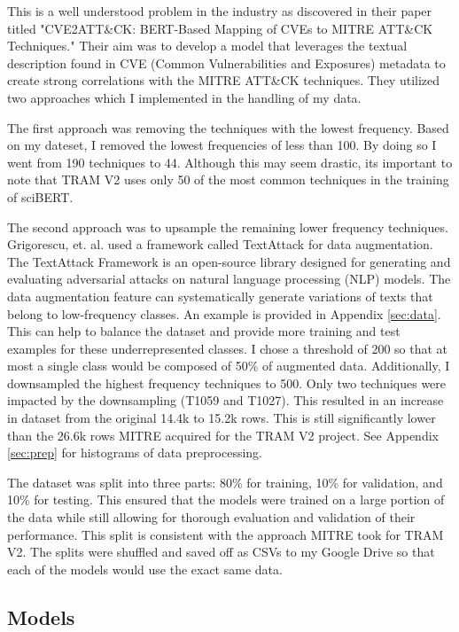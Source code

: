 \documentclass[11pt]{article}
\begin{document}
This is a well understood problem in the industry as \cite{grigorescu2022cve2att} discovered in their paper titled "CVE2ATT\&CK: BERT-Based Mapping of CVEs to MITRE ATT\&CK Techniques." Their aim was to develop a model that leverages the textual description found in CVE (Common Vulnerabilities and Exposures) metadata to create strong correlations with the MITRE ATT\&CK techniques. They utilized two approaches which I implemented in the handling of my data. 

The first approach was removing the techniques with the lowest frequency. Based on my dateset, I removed the lowest frequencies of less than 100. By doing so I went from 190 techniques to 44. Although this may seem drastic, its important to note that TRAM V2 uses only 50 of the most common techniques in the training of sciBERT. 

The second approach was to upsample the remaining lower frequency techniques. Grigorescu, et. al. used a framework called TextAttack for data augmentation. The TextAttack Framework is an open-source library designed for generating and evaluating adversarial attacks on natural language processing (NLP) models. The data augmentation feature can systematically generate variations of texts that belong to low-frequency classes. An example is provided in Appendix \ref{sec:data}. This can help to balance the dataset and provide more training and test examples for these underrepresented classes. I chose a threshold of 200 so that at most a single class would be composed of 50\% of augmented data. Additionally, I downsampled the highest frequency techniques to 500. Only two techniques were impacted by the downsampling (T1059 and T1027). This resulted in an increase in dataset from the original 14.4k to 15.2k rows. This is still significantly lower than the 26.6k rows MITRE acquired for the TRAM V2 project. See Appendix \ref{sec:prep} for histograms of data preprocessing. 

The dataset was split into three parts: 80\% for training, 10\% for validation, and 10\% for testing. This ensured that the models were trained on a large portion of the data while still allowing for thorough evaluation and validation of their performance. This split is consistent with the approach MITRE took for TRAM V2. The splits were shuffled and saved off as CSVs to my Google Drive so that each of the models would use the exact same data. 

\subsection{Models}
\end{document}
